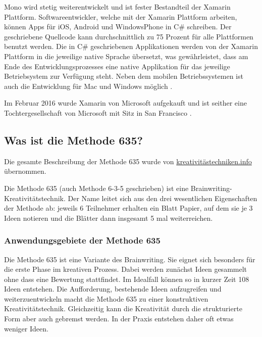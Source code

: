 Mono wird stetig weiterentwickelt und ist fester Bestandteil der Xamarin Plattform. Softwareentwickler, welche mit der Xamarin Plattform arbeiten, können Apps für iOS, Android und WindowsPhone in C\# schreiben. Der geschriebene Quellcode kann durchschnittlich zu 75 Prozent für alle Plattformen benutzt werden. Die in C\# geschriebenen Applikationen werden von der Xamarin Plattform in die jeweilige native Sprache übersetzt, was gewährleistet, dass am Ende des Entwicklungsprozesses eine native Applikation für das jeweilige Betriebsystem zur Verfügung steht. Neben dem mobilen Betriebssystemen ist auch die Entwicklung für Mac und Windows möglich \cite{XamarinCCVossel}.

Im Februar 2016 wurde Xamarin von Microsoft aufgekauft und ist seither eine Tochtergesellschaft von Microsoft mit Sitz in San Francisco \cite{XamarinWikipedia}.


\subsection{Was ist die Methode 635?} \label{subsec:methode_635_desc}
Die gesamte Beschreibung der Methode 635 wurde von \href{https://kreativitätstechniken.info/6-3-5-methode/}{kreativitästechniken.info} \cite{methode-635} übernommen. 


Die Methode 635 (auch Methode 6-3-5 geschrieben) ist eine Brainwriting-Kre\-ati\-vi\-täts\-technik. Der Name leitet sich aus den drei wesentlichen Eigenschaften der Methode ab: jeweils 6 Teilnehmer erhalten ein Blatt Papier, auf dem sie je 3 Ideen notieren und die Blätter dann insgesamt 5 mal weiterreichen.

\subsubsection*{Anwendungsgebiete der Methode 635}
Die Methode 635 ist eine Variante des Brainwriting. Sie eignet sich besonders für die erste Phase im kreativen Prozess. Dabei werden zunächst Ideen gesammelt ohne dass eine Bewertung stattfindet. Im Idealfall können so in kurzer Zeit 108 Ideen entstehen. Die Aufforderung, bestehende Ideen aufzugreifen und weiterzuentwickeln macht die Methode 635 zu einer konstruktiven Kreativitätstechnik. Gleichzeitig kann die Kreativität durch die strukturierte Form aber auch gebremst werden. In der Praxis entstehen daher oft etwas weniger Ideen.

